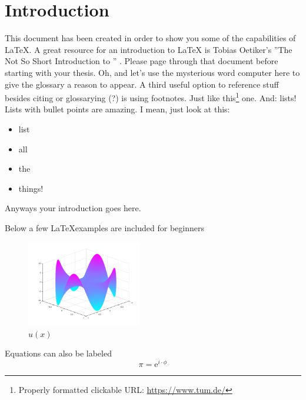 \chapter{Introduction}
\label{chapter:Introduction}
This document has been created in order to show you some of the capabilities 
of \LaTeX.  A great resource for an introduction to \LaTeX\xspace is Tobias
Oetiker's ''The Not So Short Introduction to \LaTeXe'' \cite{latex}.  Please
page through that document
before starting with your thesis.
Oh, and let's use the mysterious word \gls{computer} here to give the glossary
a reason to appear.
A third useful option to reference stuff besides citing or glossarying (?) 
is using footnotes. Just like
this\footnote{Properly formatted clickable URL: \url{https://www.tum.de/}}
one.
And: lists! Lists with bullet points are amazing. I mean, just look at this:
\begin{itemize}
	\item list
	\item all 
	\item the 
	\item things!
\end{itemize}
\par
Anyways your introduction goes here.


Below a few \LaTeX examples are included for beginners
\begin{figure}[ht]
  \centering
  \includegraphics[width=5cm]{images/swing_function_plot.png}
  \caption{$u(x)$}%
  \label{fig:swingPlot}
\end{figure}


Equations can also be labeled
\begin{equation}
	\pi = \mathrm{e}^{i\cdot\phi}
	\label{eq:equation1}
\end{equation}


